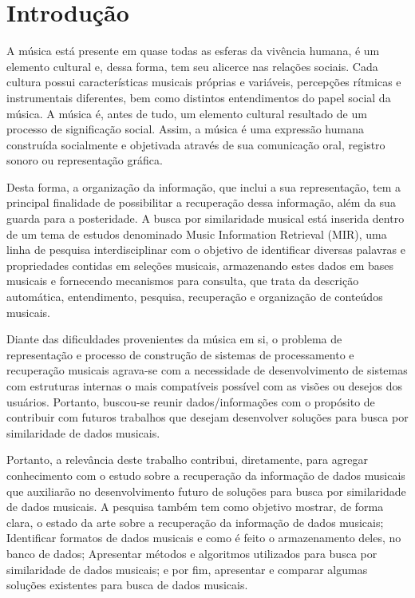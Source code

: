 \chapter{Introdução}
A música está presente em quase todas as esferas da vivência humana, é um elemento cultural e, dessa forma, tem seu alicerce nas relações sociais. Cada cultura possui características musicais próprias e variáveis, percepções rítmicas e instrumentais diferentes, bem como distintos entendimentos do papel social da música. A música é, antes de tudo, um elemento cultural resultado de um processo de significação social. Assim, a música é uma expressão humana construída socialmente e objetivada através de sua comunicação oral, registro sonoro ou representação gráfica.

Desta forma, a organização da informação, que inclui a sua representação, tem a principal finalidade de possibilitar a recuperação dessa informação, além da sua guarda para a posteridade. A busca por similaridade musical está inserida dentro de um tema de estudos denominado Music Information Retrieval (MIR), uma linha de pesquisa interdisciplinar com o objetivo de identificar diversas palavras e propriedades contidas em seleções musicais, armazenando estes dados em bases musicais e fornecendo mecanismos para consulta, que trata da descrição automática, entendimento, pesquisa, recuperação e organização de conteúdos musicais.

Diante das dificuldades provenientes da música em si, o problema de representação e processo de construção de sistemas de processamento e recuperação musicais agrava-se com a necessidade de desenvolvimento de sistemas com estruturas internas o mais compatíveis possível com as visões ou desejos dos usuários. Portanto, buscou-se reunir dados/informações com o propósito de contribuir com futuros trabalhos que desejam desenvolver soluções para busca por similaridade de dados musicais.

Portanto, a relevância deste trabalho contribui, diretamente, para agregar conhecimento com o estudo sobre a recuperação da informação de dados musicais que auxiliarão no desenvolvimento futuro de soluções para busca por similaridade de dados musicais. A pesquisa também tem como objetivo mostrar, de forma clara, o estado da arte sobre a recuperação da informação de dados musicais; Identificar formatos de dados musicais e como é feito o armazenamento deles, no banco de dados; Apresentar métodos e algoritmos utilizados para busca por similaridade de dados musicais; e por fim, apresentar e comparar algumas soluções existentes para busca de dados musicais.

